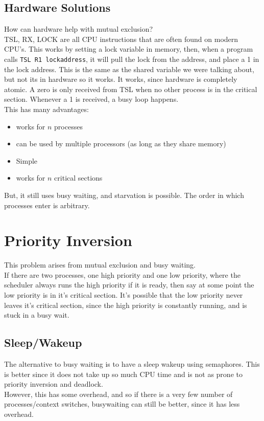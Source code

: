 \documentclass[12pt]{article}
\theoremstyle{definition}
\begin{document}
\subsection{Hardware Solutions}
How can hardware help with mutual exclusion?
\\ \linebreak
TSL, RX, LOCK are all CPU instructions that are often found on modern CPU's. This works by setting a lock variable in memory, then, when a program calls \texttt{TSL R1 lockaddress}, it will pull the lock from the address, and place a 1 in the lock address. This is the same as the shared variable we were talking about, but not its in hardware so it works. It works, since hardware is completely atomic. A zero is only received from TSL when no other process is in the critical section. Whenever a 1 is received, a busy loop happens.
\\ \linebreak
This has many advantages:
\begin{itemize}
	\item works for $n$ processes
	\item can be used by multiple processors (as long as they share memory)
	\item Simple
	\item works for $n$ critical sections
\end{itemize}
But, it still uses busy waiting, and starvation is possible. The order in which processes enter is arbitrary.
\\ \linebreak

\section{Priority Inversion}
This problem arises from mutual exclusion and busy waiting. 
\\ \linebreak
If there are two processes, one high priority and one low priority, where the scheduler always runs the high priority if it is ready, then say at some point the low priority is in it's critical section. It's possible that the low priority never leaves it's critical section, since the high priority is constantly running, and is stuck in a busy wait. 

\subsection{Sleep/Wakeup}
The alternative to busy waiting is to have a sleep wakeup using semaphores. This is better since it does not take up so much CPU time and is not as prone to priority inversion and deadlock.
\\ \linebreak
However, this has some overhead, and so if there is a very few number of processes/context switches, busywaiting can still be better, since it has less overhead.
\\ \linebreak
\end{document}
